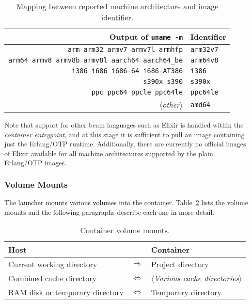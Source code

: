 \begin{table}[h]
  \setlength{\tabcolsep}{10pt}
  \centering
  \begin{tabular}{ r l }
    Output of \lstinline|uname -m| & Identifier \\
    \hline
    \lstinline|arm arm32 armv7 armv7l armhfp| & \lstinline|arm32v7| \\
    \lstinline|arm64 armv8 armv8b armv8l aarch64 aarch64_be| & \lstinline|arm64v8| \\
    \lstinline|i386 i686 i686-64 i686-AT386| & \lstinline|i386| \\
    \lstinline|s390x s390| & \lstinline|s390x| \\
    \lstinline|ppc ppc64 ppcle ppc64le| & \lstinline|ppc64le| \\
    $\langle$\emph{other}$\rangle$ & \lstinline|amd64| \\
  \end{tabular}
  \caption{Mapping between reported machine architecture and image identifier.}\label{table:architectures}
\end{table}

Note that support for other \acrshort{beam} languages such as Elixir is handled within the \emph{container entrypoint}, and at this stage it is sufficient to pull an image containing just the Erlang/OTP runtime. Additionally, there are currently no official images of Elixir available for all machine architectures supported by the plain Erlang/OTP images.

\cleardoublepage
\subsubsection{Volume Mounts}
The launcher mounts various volumes into the container. Table~\ref{table:volumes} lists the volume mounts and the following paragraphs describe each one in more detail.

\begin{table}[h]
  \setlength{\tabcolsep}{10pt}
  \centering
  \begin{tabular}{ l c l }
    Host & & Container \\
    \hline
    Current working directory &
      $\Longrightarrow$ &
      Project directory \\
    Combined cache directory &
      $\Longleftrightarrow$ &
      $\langle$\emph{Various cache directories}$\rangle$ \\
    RAM disk or temporary directory &
      $\Longleftrightarrow$ &
      Temporary directory \\
  \end{tabular}
  \caption{Container volume mounts.}\label{table:volumes}
\end{table}

